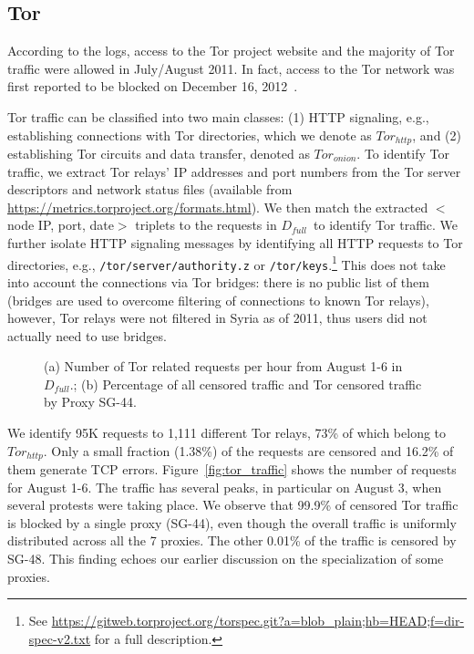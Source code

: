 \documentclass{sig-alternate-2013}
\def\df{$D_{full}$\xspace}
\begin{document}
         
\subsection{Tor}\label{sec:tor}
According to the logs, access to the Tor project website and the majority of Tor traffic were allowed in July/August 2011. In fact, access to the Tor network was first reported to be blocked on December 16, 2012~\cite{tor-syria}.

Tor traffic can be classified into two main classes: (1) HTTP signaling, e.g., establishing connections with Tor directories, which we denote as $Tor_{http}$, and (2) establishing Tor circuits and data transfer, denoted as $Tor_ {onion}$. 
To identify Tor traffic, we extract Tor relays' IP addresses and port numbers from the Tor server descriptors and network status files (available from \url{https://metrics.torproject.org/formats.html}). We then match the extracted $<$node IP, port, date$>$ triplets to the requests in \df\ to identify Tor traffic. We further isolate HTTP signaling messages by identifying all HTTP requests to Tor directories, e.g.,  \texttt{/tor/server/authority.z} or  \texttt{/tor/keys}.\footnote{See \url{https://gitweb.torproject.org/torspec.git?a=blob_plain;hb=HEAD;f=dir-spec-v2.txt} for a full description.}
This does not take into account the connections via Tor bridges: there is no public list of them (bridges are used to overcome filtering of connections to known Tor relays), however,  Tor relays were not filtered in Syria as of 2011, thus users did not actually need to use bridges.


\begin{figure}[t!]
  \begin{center}
        \vspace*{-0.2cm}
        \caption{(a) Number of Tor related requests per hour from August 1-6 in \df.; (b) Percentage of all censored traffic and Tor censored traffic by Proxy SG-44.}
	\end{center}


\end{figure}



We identify 95K requests to 1,111 different Tor relays, 73\% of which belong to $Tor_{http}$. Only a small fraction (1.38\%) of the requests are censored and 16.2\% of them generate TCP errors. Figure~\ref{fig:tor_traffic} shows the number of requests for August 1-6. The traffic has several peaks, in particular on August 3, when several protests were taking place.
We observe that 99.9\% of censored Tor traffic is blocked by a single proxy (SG-44), even though the overall traffic is uniformly distributed across all the 7 proxies. The other 0.01\% of the traffic is censored by SG-48. This finding echoes our earlier discussion on the specialization of some proxies. 
\end{document}
